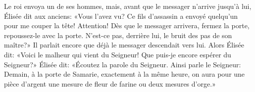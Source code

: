 Le roi envoya un de ses hommes,
	mais, avant que le messager n’arrive jusqu’à lui, Élisée dit aux anciens:
	«Vous l’avez vu?
	Ce fils d’assassin a envoyé quelqu’un pour me couper la tête!
Attention! Dès que le messager arrivera, fermez la porte, repoussez-le avec la porte.
N’est-ce pas, derrière lui, le bruit des pas de son maître?»
Il parlait encore que déjà le messager descendait vers lui.
Alors Élisée dit:
	«Voici le malheur qui vient du Seigneur!
	Que puis-je encore espérer du Seigneur?»
Élisée dit: «Écoutez la parole du Seigneur.
	Ainsi parle le Seigneur: Demain, à la porte de Samarie, exactement à la même heure,
	on aura pour une pièce d’argent une mesure de fleur de farine ou deux mesures d’orge.»
